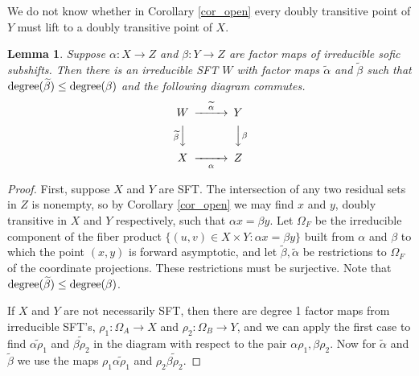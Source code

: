 \documentclass{kepart2010}
\theoremstyle{plain}
\newtheorem{lem}[thm]{Lemma}
\theoremstyle{definition}
\theoremstyle{remark}
\theoremstyle{definition}
\numberwithin{equation}{section}
\begin{document}
We do not know whether in  Corollary \ref{cor_open} every doubly
transitive point of $Y$ must lift to a doubly transitive point of
$X$.

\begin{lem} \label{surjcomponent}
Suppose $\alpha: X\to Z$ and $\beta :Y\to Z$ are  factor maps of
irreducible sofic subshifts. Then there is an irreducible SFT $W$
with factor maps $\widetilde {\alpha}$ and $\widetilde{\beta}$ such
that $\textnormal{degree}(\widetilde{\beta} ) \leq
\textnormal{degree}(\beta )$ and the following diagram commutes.
 \begin{equation}
 \begin{CD}
W & @>\ \widetilde{\alpha}\ >> & Y \\
 @V \widetilde{\beta} VV & & @VV \beta V\\
X & @>>\ \alpha \ > & Z
 \end{CD}
 \end{equation}
\end{lem}

\begin{proof}
First, suppose $X$ and $Y$ are SFT. The intersection of any two
residual sets in $Z$ is nonempty, so by
 Corollary \ref{cor_open} we may find $x$ and $y$, doubly
transitive in $X$ and $Y$ respectively, such that
$\alpha x = \beta y$.
Let $\Omega_F$ be the irreducible component of the
 fiber product
 {
 $\{ (u,v) \in X \times Y : \alpha x = \beta y\}$
 }
 built from $\alpha$
and $\beta$ to which the point $(x,y)$ is forward asymptotic, and
let $\widetilde {\beta},\widetilde{\alpha}$ be restrictions to
$\Omega_F$ of the coordinate projections. These restrictions must be
surjective. Note that $\textnormal{degree}(\widetilde{\beta} ) \leq
\textnormal{degree}(\beta )$.

If $X$ and $Y$ are not necessarily SFT, then there are degree 1
factor maps from irreducible SFT's, $\rho_1 :\Omega_A \to X$ and
$\rho_2 :\Omega_B \to Y$, and we can apply the first case to find
$\widetilde{\alpha \rho_1}$ and $\widetilde {\beta \rho_2}$  in the
diagram with respect to the pair $\alpha \rho_1, \beta \rho_2$. Now
for
 $\widetilde {\alpha}$ and $ \widetilde{\beta}$ we
use the maps
$\rho_1 \widetilde{\alpha \rho_1}$ and
$\rho_2 \widetilde {\beta \rho_2}$.
\end{proof}
\end{document}
